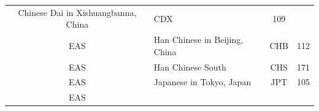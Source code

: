 \documentclass[]{book}
\begin{document}
\begin{longtable}[]{@{}clcc@{}}
\begin{minipage}[t]{0.59\columnwidth}
Chinese Dai in Xishuangbanna, China\strut
\end{minipage} & \begin{minipage}[t]{0.09\columnwidth}\centering\strut
CDX\strut
\end{minipage} & \begin{minipage}[t]{0.07\columnwidth}\centering\strut
109\strut
\end{minipage}\tabularnewline
\begin{minipage}[t]{0.14\columnwidth}\centering\strut
EAS\strut
\end{minipage} & \begin{minipage}[t]{0.59\columnwidth}\raggedright\strut
Han Chinese in Beijing, China\strut
\end{minipage} & \begin{minipage}[t]{0.09\columnwidth}\centering\strut
CHB\strut
\end{minipage} & \begin{minipage}[t]{0.07\columnwidth}\centering\strut
112\strut
\end{minipage}\tabularnewline
\begin{minipage}[t]{0.14\columnwidth}\centering\strut
EAS\strut
\end{minipage} & \begin{minipage}[t]{0.59\columnwidth}\raggedright\strut
Han Chinese South\strut
\end{minipage} & \begin{minipage}[t]{0.09\columnwidth}\centering\strut
CHS\strut
\end{minipage} & \begin{minipage}[t]{0.07\columnwidth}\centering\strut
171\strut
\end{minipage}\tabularnewline
\begin{minipage}[t]{0.14\columnwidth}\centering\strut
EAS\strut
\end{minipage} & \begin{minipage}[t]{0.59\columnwidth}\raggedright\strut
Japanese in Tokyo, Japan\strut
\end{minipage} & \begin{minipage}[t]{0.09\columnwidth}\centering\strut
JPT\strut
\end{minipage} & \begin{minipage}[t]{0.07\columnwidth}\centering\strut
105\strut
\end{minipage}\tabularnewline
\begin{minipage}[t]{0.14\columnwidth}\centering\strut
EAS\strut
\end{minipage} & \begin{minipage}[t]{0.59\columnwidth}\raggedright\strut

\end{minipage}
\end{longtable}
\end{document}
